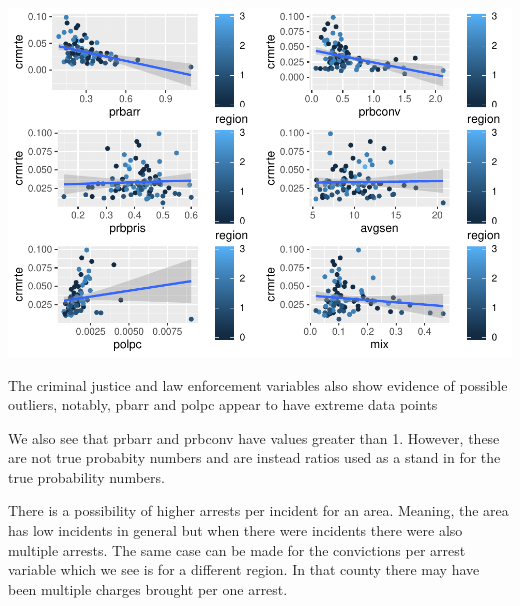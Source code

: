 \documentclass[]{article}
\begin{document}
\includegraphics{Bagnard_Gaustad_Hartman_Leung_Lab_3_files/figure-latex/unnamed-chunk-22-1.pdf}

The criminal justice and law enforcement variables also show evidence of
possible outliers, notably, pbarr and polpc appear to have extreme data
points

We also see that prbarr and prbconv have values greater than 1. However,
these are not true probabity numbers and are instead ratios used as a
stand in for the true probability numbers.

There is a possibility of higher arrests per incident for an area.
Meaning, the area has low incidents in general but when there were
incidents there were also multiple arrests. The same case can be made
for the convictions per arrest variable which we see is for a different
region. In that county there may have been multiple charges brought per
one arrest.
\end{document}
